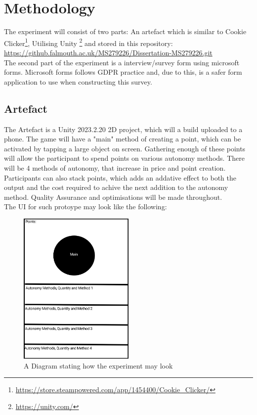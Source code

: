 \documentclass[conference]{IEEEtran}
\begin{document}
\section{Methodology}
 The experiment will consist of two parts: An artefact which is similar to Cookie Clicker\footnote{\url{https://store.steampowered.com/app/1454400/Cookie_Clicker/}}, Utilising Unity \footnote{\url{https://unity.com/}} and stored in this repository:\\

\url{https://github.falmouth.ac.uk/MS279226/Dissertation-MS279226.git}\\

The second part of the experiment is a interview/survey form using microsoft forms. Microsoft forms follows GDPR practice and, due to this, is a safer form application to use when constructing this survey.

\subsection{Artefact}
The Artefact is a Unity 2023.2.20 2D project, which will a build uploaded to a phone. The game will have a "main" method of creating a point, which can be activated by tapping a large object on screen. Gathering enough of these points will allow the participant to spend points on various autonomy methods. There will be 4 methods of autonomy, that increase in price and point creation. Participants can also stack points, which adds an addative effect to both the output and the cost required to achive the next addition to the autonomy method. Quality Assurance and optimisations will be made throughout.\\

The UI for such protoype may look like the following:

\begin{figure}[H]
\includegraphics[width = 0.5\textwidth]{PrototypeUI}
\caption{A Diagram stating how the experiment may look}
\end{figure}
\end{document}

